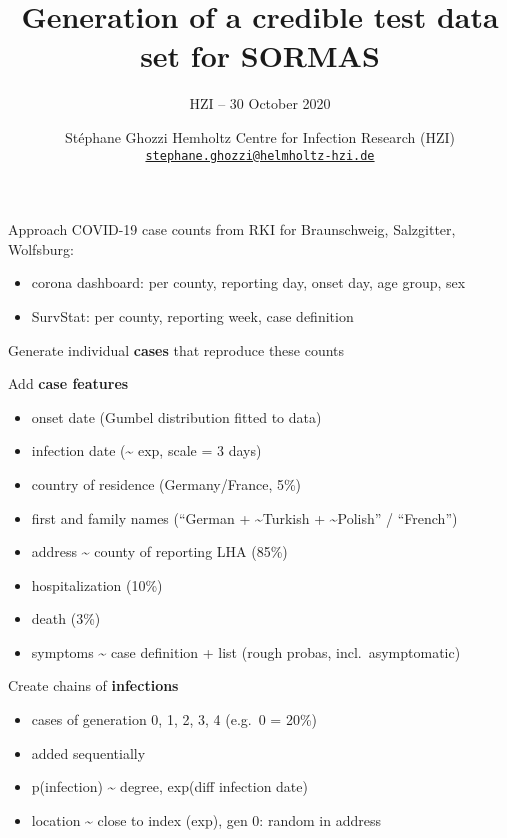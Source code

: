 \documentclass[
  8pt,
  ignorenonframetext,
]{beamer}
\title{Generation of a credible test data set for SORMAS}
\subtitle{HZI -- 30 October 2020}
\author{\newline \newline Stéphane Ghozzi \newline \small Hemholtz
Centre for Infection Research (HZI)
\newline \href{mailto:stephane.ghozzi@helmholtz-hzi.de}{\nolinkurl{stephane.ghozzi@helmholtz-hzi.de}}
\normalsize}
\date{}
\providecommand{\tightlist}{%
  \setlength{\itemsep}{0pt}\setlength{\parskip}{0pt}}
\begin{document}
\frame{\titlepage}

\begin{frame}{Approach}
\protect\hypertarget{approach}{}
COVID-19 case counts from RKI for Braunschweig, Salzgitter, Wolfsburg:

\begin{itemize}
\tightlist
\item
  corona dashboard: per county, reporting day, onset day, age group, sex
\item
  SurvStat: per county, reporting week, case definition
\end{itemize}

\vspace{1.5cm}

Generate individual \textbf{cases} that reproduce these counts
\end{frame}

\begin{frame}
Add \textbf{case features}

\begin{itemize}
\tightlist
\item
  onset date (Gumbel distribution fitted to data)
\item
  infection date (\textasciitilde{} exp, scale = 3 days)
\item
  country of residence (Germany/France, 5\%)
\item
  first and family names (``German + \textasciitilde Turkish +
  \textasciitilde Polish'' / ``French'')
\item
  address \textasciitilde{} county of reporting LHA (85\%)
\item
  hospitalization (10\%)
\item
  death (3\%)
\item
  symptoms \textasciitilde{} case definition + list (rough probas,
  incl.~asymptomatic)
\end{itemize}
\end{frame}

\begin{frame}
Create chains of \textbf{infections}

\begin{itemize}
\tightlist
\item
  cases of generation 0, 1, 2, 3, 4 (e.g.~0 = 20\%)
\item
  added sequentially
\item
  p(infection) \textasciitilde{} degree, exp(diff infection date)
\item
  location \textasciitilde{} close to index (exp), gen 0: random in
  address
\end{itemize}
\end{frame}
\end{document}
